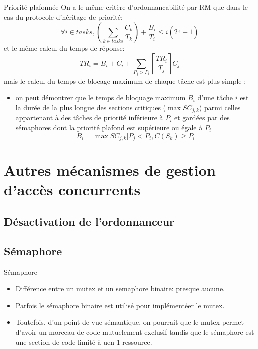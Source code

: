 \begin{frame}{Priorité plafonnée} 
  On a  le même critère d'ordonnancabilité  par RM que dans  le cas du
  protocole d'héritage de priorité:
  $$\forall i \in tasks, \left( \sum_{k \in tasks} \frac{C_k}{T_k} \right) + \frac{B_i}{T_i} ≤ i \left(2^{\frac{1}{i}}-1\right)$$
  et le même calcul du temps de réponse:
  $$TR_i = B_i + C_i + \sum_{P_j > P_i} \left\lceil\frac{TR_i}{T_j}\right\rceil C_j$$
  mais le calcul du temps de  blocage maximum de chaque tâche est plus
  simple :
  \begin{itemize}
  \item on peut démontrer que le temps de bloquage maximum $B_i$ d'une
    tâche $i$  est la durée de  la plus longue  des sections critiques
    ($\max  SC_{j,k}$)  parmi  celles  appartenant  à  des  tâches  de
    priorité inférieure à $P_i$ et  gardées par des sémaphores dont la
    priorité plafond est supérieure ou égale à $P_i$
    $$B_i = \max SC_{j,k} | P_j < P_i, C(S_k) ≥ P_i$$ 
  \end{itemize}
\end{frame}

\section{Autres mécanismes de gestion d'accès concurrents}

\subsection{Désactivation de l'ordonnanceur}


\subsection{Sémaphore}

\begin{frame}{Sémaphore}
  \begin{itemize} 
  \item  Différence entre un  mutex et  un semaphore  binaire: presque
    aucune.
  \item Parfois le sémaphore  binaire est utilisé pour implémentéer le
    mutex.
  \item Toutefois,  d'un point de  vue sémantique, on pourrait  que le
    mutex  permet  d'avoir un  morceau  de  code mutuelement  exclusif
    tandis que  le sémaphore est  une section de  code limité à  uen 1
    ressource.
  \end{itemize} 
\end{frame} 

